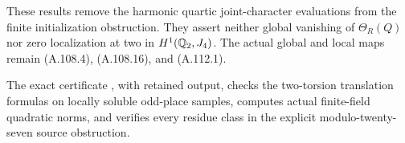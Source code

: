 These results remove the harmonic quartic
joint-character evaluations from the finite
initialization obstruction.
They assert neither global vanishing of
$\Theta_R(Q)$ nor zero localization at two in
$H^1(\mathbb Q_2,J_4)$.
The actual global and local maps remain
(A.108.4), (A.108.16), and (A.112.1).

The exact certificate
,
with retained output, checks the two-torsion translation
formulas on locally soluble odd-place samples, computes
actual finite-field quadratic norms, and verifies every
residue class in the explicit modulo-twenty-seven
source obstruction.

